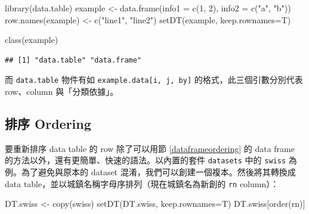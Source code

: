 \documentclass[
]{book}
\newenvironment{Shaded}{\begin{snugshade}}{\end{snugshade}}
\newcommand{\AttributeTok}[1]{\textcolor[rgb]{0.77,0.63,0.00}{#1}}
\newcommand{\DecValTok}[1]{\textcolor[rgb]{0.00,0.00,0.81}{#1}}
\newcommand{\FunctionTok}[1]{\textcolor[rgb]{0.00,0.00,0.00}{#1}}
\newcommand{\NormalTok}[1]{#1}
\newcommand{\OtherTok}[1]{\textcolor[rgb]{0.56,0.35,0.01}{#1}}
\newcommand{\StringTok}[1]{\textcolor[rgb]{0.31,0.60,0.02}{#1}}
\theoremstyle{definition}
\theoremstyle{remark}
\begin{document}
\begin{Shaded}
\begin{Highlighting}[]
\FunctionTok{library}\NormalTok{(data.table)}
\NormalTok{example }\OtherTok{\textless{}{-}} \FunctionTok{data.frame}\NormalTok{(}\AttributeTok{info1 =} \FunctionTok{c}\NormalTok{(}\DecValTok{1}\NormalTok{, }\DecValTok{2}\NormalTok{), }\AttributeTok{info2 =} \FunctionTok{c}\NormalTok{(}\StringTok{"a"}\NormalTok{, }\StringTok{"b"}\NormalTok{))}
\FunctionTok{row.names}\NormalTok{(example) }\OtherTok{\textless{}{-}} \FunctionTok{c}\NormalTok{(}\StringTok{"line1"}\NormalTok{, }\StringTok{"line2"}\NormalTok{)}
\FunctionTok{setDT}\NormalTok{(example, }\AttributeTok{keep.rownames=}\NormalTok{T)}
\end{Highlighting}
\end{Shaded}

\begin{Shaded}
\begin{Highlighting}[]
\FunctionTok{class}\NormalTok{(example)}
\end{Highlighting}
\end{Shaded}

\begin{verbatim}
## [1] "data.table" "data.frame"
\end{verbatim}

而 \texttt{data.table} 物件有如 \texttt{example.data{[}i,\ j,\ by{]}} 的格式，此三個引數分別代表 row、column 與「分類依據」。

\hypertarget{ux6392ux5e8f-ordering}{%
\subsection{排序 Ordering}\label{ux6392ux5e8f-ordering}}

要重新排序 data table 的 row 除了可以用節 \ref{dataframeordering} 的 data frame 的方法以外，還有更簡單、快速的語法。以內置的套件 \texttt{datasets} 中的 \texttt{swiss} 為例。為了避免與原本的 dataset 混淆，我們可以創建一個複本。然後將其轉換成 data table，並以城鎮名稱字母序排列（現在城鎮名為新創的 \texttt{rn} column）：

\begin{Shaded}
\begin{Highlighting}[]
\NormalTok{DT.swiss }\OtherTok{\textless{}{-}} \FunctionTok{copy}\NormalTok{(swiss)}
\FunctionTok{setDT}\NormalTok{(DT.swiss, }\AttributeTok{keep.rownames=}\NormalTok{T)}
\NormalTok{DT.swiss[}\FunctionTok{order}\NormalTok{(rn)]}
\end{Highlighting}
\end{Shaded}
\end{document}

